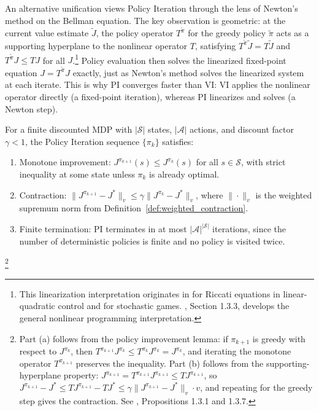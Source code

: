 An alternative unification views Policy Iteration through the lens of Newton's method on the Bellman equation. The key observation is geometric: at the current value estimate $\tilde{J}$, the policy operator $T^{\tilde{\pi}}$ for the greedy policy $\tilde{\pi}$ acts as a supporting hyperplane to the nonlinear operator $T$, satisfying $T^{\tilde{\pi}} \tilde{J} = T\tilde{J}$ and $T^{\tilde{\pi}} J \leq TJ$ for all $J$.\footnote{This linearization interpretation originates in \citet{kleinman1968} for Riccati equations in linear-quadratic control and \citet{pollatschek1969} for stochastic games. \citet{bertsekas2022}, Section 1.3.3, develops the general nonlinear programming interpretation.} Policy evaluation then solves the linearized fixed-point equation $J = T^{\tilde{\pi}} J$ exactly, just as Newton's method solves the linearized system at each iterate. This is why PI converges faster than VI: VI applies the nonlinear operator directly (a fixed-point iteration), whereas PI linearizes and solves (a Newton step).

\begin{theorem}
\label{thm:pi_convergence}
For a finite discounted MDP with $|\mathcal{S}|$ states, $|\mathcal{A}|$ actions, and discount factor $\gamma < 1$, the Policy Iteration sequence $\{\pi_k\}$ satisfies:
\begin{enumerate}
\item[(a)] Monotone improvement: $J^{\pi_{k+1}}(s) \leq J^{\pi_k}(s)$ for all $s \in \mathcal{S}$, with strict inequality at some state unless $\pi_k$ is already optimal.
\item[(b)] Contraction: $\|J^{\pi_{k+1}} - J^*\|_v \leq \gamma \|J^{\pi_k} - J^*\|_v$, where $\|\cdot\|_v$ is the weighted supremum norm from Definition~\ref{def:weighted_contraction}.
\item[(c)] Finite termination: PI terminates in at most $|\mathcal{A}|^{|\mathcal{S}|}$ iterations, since the number of deterministic policies is finite and no policy is visited twice.
\end{enumerate}
\footnote{Part (a) follows from the policy improvement lemma: if $\pi_{k+1}$ is greedy with respect to $J^{\pi_k}$, then $T^{\pi_{k+1}} J^{\pi_k} \leq T^{\pi_k} J^{\pi_k} = J^{\pi_k}$, and iterating the monotone operator $T^{\pi_{k+1}}$ preserves the inequality. Part (b) follows from the supporting-hyperplane property: $J^{\pi_{k+1}} = T^{\pi_{k+1}} J^{\pi_{k+1}} \leq T J^{\pi_{k+1}}$, so $J^{\pi_{k+1}} - J^* \leq TJ^{\pi_{k+1}} - TJ^* \leq \gamma \|J^{\pi_{k+1}} - J^*\|_v \cdot v$, and repeating for the greedy step gives the contraction. See \citet{bertsekas2022}, Propositions 1.3.1 and 1.3.7.}
\end{theorem}

